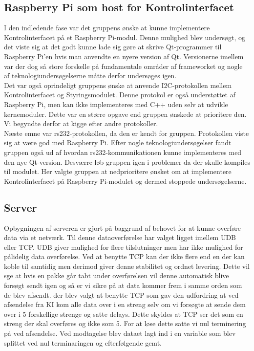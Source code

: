
\subsection{Raspberry Pi som host for Kontrolinterfacet}
I den indledende fase var det gruppens ønske at kunne implementere Kontrolinterfacet på et Raspberry Pi-modul. Denne mulighed blev undersøgt, og det viste sig at det godt kunne lade sig gøre at skrive Qt-programmer til Raspberry Pi'en hvis man anvendte en nyere version af Qt.
Versionerne imellem var der dog så store forskelle på fundamentale områder af frameworket og nogle af teknologiundersøgelserne måtte derfor undersøges igen.\\
Det var også oprindeligt gruppens ønske at anvende I2C-protokollen mellem Kontrolinterfacet og Styringsmodulet. Denne protokol er også understøttet af Raspberry Pi, men kan ikke implementeres med C++ uden selv at udvikle kernemoduler.
Dette var en større opgave end gruppen ønskede at prioritere den. Vi begyndte derfor at kigge efter andre protokoller.\\
Næste emne var rs232-protokollen, da den er kendt for gruppen. Protokollen viste sig at være god med Raspberry Pi. Efter nogle teknologiundersøgelser fandt gruppen også ud af hvordan rs232-kommunikationen kunne implementeres med den nye Qt-version.
Desværre løb gruppen igen i problemer da der skulle kompiles til modulet. Her valgte gruppen at nedprioritere ønsket om at implementere Kontrolinterfacet på Raspberry Pi-modulet og dermed stoppede undersøgelserne.

\subsection{Server}
Opbygningen af serveren er gjort på baggrund af behovet for at kunne overføre data via et netværk. Til denne dataoverførelse har valget ligget imellem UDB eller TCP. UDB giver mulighed for flere tilslutninger men har ikke mulighed for pålidelig data overførelse. Ved at benytte TCP kan der ikke flere end en der kan koble til samtidig men derimod giver denne stabilitet og ordnet levering. Dette vil sge at hvis en pakke går tabt under overførelsen vil denne automatisk blive forsøgt sendt igen og så er vi sikre på at data kommer frem i samme orden som de blev afsendt. 
der blev valgt at benytte TCP som gav den udfordring at ved afsendelse fra KI kom alle data over i en streng selv om vi forsøgte at sende dem over i 5 forskellige strenge og satte delays. Dette skyldes at TCP ser det som en streng der skal overføres og ikke som 5. For at løse dette satte vi nul terminering på ved afsendelse. Ved modtagelse blev dataet lagt ind i en variable som blev splittet ved nul terminaringen og efterfølgende gemt.

